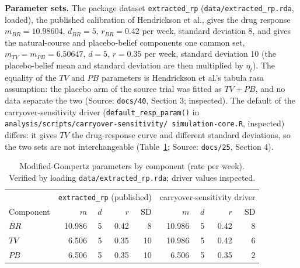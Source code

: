 \documentclass[11pt]{article}
\newcommand{\code}[1]{\texttt{#1}}
\begin{document}
\textbf{Parameter sets.} The package dataset \code{extracted\_rp}
(\code{data/extracted\_rp.rda}, loaded), the published calibration of
Hendrickson et al., gives the drug response $m_{BR} = 10.98604$,
$d_{BR} = 5$, $r_{BR} = 0.42$ per week, standard deviation 8, and gives
the natural-course and placebo-belief components one common set,
$m_{TV} = m_{PB} = 6.50647$, $d = 5$, $r = 0.35$ per week, standard
deviation 10 (the placebo-belief mean and standard deviation are then
multiplied by $\eta_t$). The equality of the $TV$ and $PB$ parameters
is Hendrickson et al.'s tabula rasa assumption: the placebo arm of the
source trial was fitted as $TV + PB$, and no data separate the two
(Source: \code{docs/40}, Section 3; inspected). The default of the
carryover-sensitivity driver (\code{default\_resp\_param()} in
\code{analysis/\allowbreak scripts/\allowbreak carryover-sensitivity/\allowbreak
simulation-core.R}, inspected) differs: it gives $TV$ the drug-response
curve and different standard deviations, so the two sets are not
interchangeable (Table~\ref{tab:invb-rp}; Source: \code{docs/25},
Section 4).

\begin{table}[h]
\centering\small
\caption{Modified-Gompertz parameters by component (rate per week).
Verified by loading \code{data/extracted\_rp.rda}; driver values
inspected.}
\label{tab:invb-rp}
\begin{tabular}{@{}lrrrr@{\qquad}rrrr@{}}
\toprule
 & \multicolumn{4}{c}{\code{extracted\_rp} (published)} &
   \multicolumn{4}{c}{carryover-sensitivity driver} \\
Component & $m$ & $d$ & $r$ & SD & $m$ & $d$ & $r$ & SD \\
\midrule
$BR$ & 10.986 & 5 & 0.42 & 8 & 10.986 & 5 & 0.42 & 8 \\
$TV$ & 6.506 & 5 & 0.35 & 10 & 10.986 & 5 & 0.42 & 6 \\
$PB$ & 6.506 & 5 & 0.35 & 10 & 6.506 & 5 & 0.35 & 2 \\
\bottomrule
\end{tabular}
\end{table}
\end{document}
